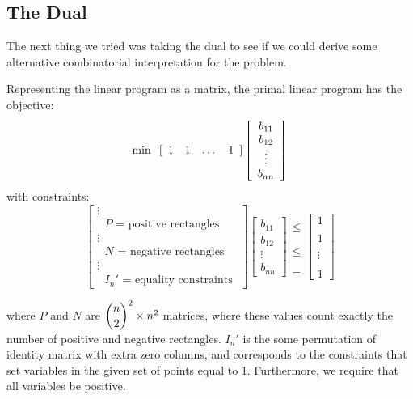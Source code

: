 \documentclass[11pt]{article}
\begin{document}
\subsection{The Dual}

The next thing we tried was taking the dual to see if we could derive some alternative combinatorial interpretation for the problem.

Representing the linear program as a matrix, the primal linear program has the objective:
\[ \min \hspace{.1in} [ \begin{array}{cccc} 1 & 1 & \dots & 1 \end{array} ] \left[\begin{array}{c} b_{11} \\ b_{12} \\ \vdots \\ b_{nn} \end{array} \right]\]
with constraints:
\[ \left[ \begin{array}{c} \vdots \\ \text{ $P$ = positive rectangles } \\ \vdots \\ \text{ $N$ = negative rectangles } \\ \vdots \\ \text{ $I_n'$ = equality constraints } \end{array} \right] 
\left[\begin{array}{c} b_{11} \\ b_{12} \\ \vdots \\ b_{nn} \end{array} \right] 
\begin{array}{c} \\ \leq \\ \\ \\ \leq \\ \\ \\ = \end{array} 
\left[\begin{array}{c} 1 \\\\ 1 \\\\ \vdots \\\\ 1 \end{array} \right] \]

where $P$ and $N$ are $\dbinom{n}{2}^2 \times n^2$ matrices, where these values count exactly the number of positive and negative rectangles. $I_n'$ is the some permutation of identity matrix with extra zero columns, and corresponds to the constraints that set variables in the given set of points equal to 1. Furthermore, we require that all variables be positive. 
\end{document}
